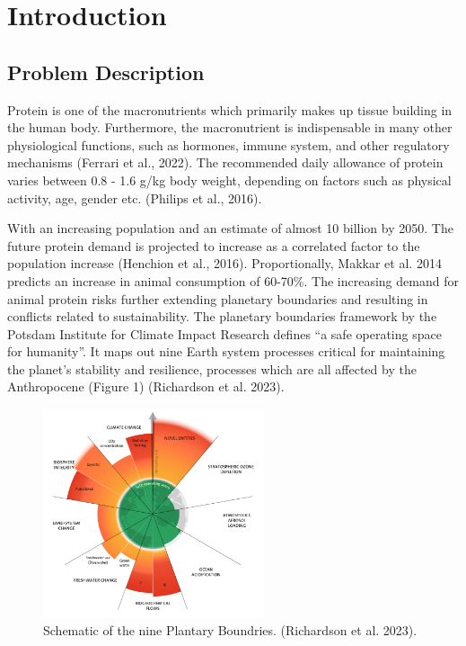 \setcounter{chapter}{0}
\setcounter{section}{0}
\chapter{Introduction}
\setlength{\headheight}{12.71342pt}
\addtolength{\topmargin}{-0.71342pt}

\section{Problem Description}
Protein is one of the macronutrients which primarily makes up tissue building in the human body. Furthermore, the macronutrient is indispensable in many other physiological functions, such as hormones, immune system, and other regulatory mechanisms (Ferrari et al., 2022). The recommended daily allowance of protein varies between 0.8 - 1.6 g/kg body weight, depending on factors such as physical activity, age, gender etc. (Philips et al., 2016).

\vspace{1em}
With an increasing population and an estimate of almost 10 billion by 2050. The future protein demand is projected to increase as a correlated factor to the population increase (Henchion et al., 2016). Proportionally, Makkar et al. 2014 predicts an increase in animal consumption of 60-70\%. The increasing demand for animal protein risks further extending planetary boundaries and resulting in conflicts related to sustainability. The planetary boundaries framework by the Potsdam Institute for Climate Impact Research defines “a safe operating space for humanity”. It maps out nine Earth system processes critical for maintaining the planet's stability and resilience, processes which are all affected by the Anthropocene (Figure 1) (Richardson et al. 2023).

\begin{figure}[H]
    \centering
    \includegraphics[width=0.58\textwidth]{Figures/fig_01.png}
    \caption{Schematic of the nine Plantary Boundries. (Richardson et al. 2023).}
    \label{fig:introduction_01}
\end{figure}

